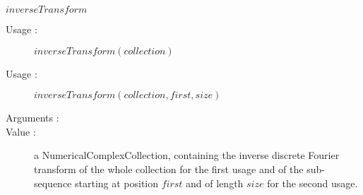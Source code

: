 \begin{description}
\begin{description}
  \item $inverseTransform$
    \begin{description}
    \item[Usage :]  $inverseTransform(collection)$
    \item[Usage :]  $inverseTransform(collection, first, size)$
    \item[Arguments :]  \strut
    \item[Value :] a NumericalComplexCollection, containing the inverse discrete Fourier transform of the whole collection for the first usage and of the sub-sequence starting at position $first$ and of length $size$ for the second usage.
    \end{description}

  \end{description}

\end{description}